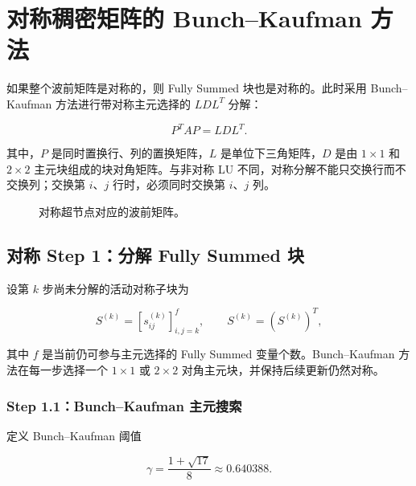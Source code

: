 \section{对称稠密矩阵的 Bunch--Kaufman 方法}

如果整个波前矩阵是对称的，则 Fully Summed 块也是对称的。此时采用 Bunch--Kaufman 方法进行带对称主元选择的 $LDL^T$ 分解：

\[
P^TAP=LDL^T.
\]

其中，$P$ 是同时置换行、列的置换矩阵，$L$ 是单位下三角矩阵，$D$ 是由 $1\times1$ 和 $2\times2$ 主元块组成的块对角矩阵。与非对称 LU 不同，对称分解不能只交换行而不交换列；交换第 $i$、$j$ 行时，必须同时交换第 $i$、$j$ 列。

\begin{figure}[htbp]
\centering
{}
\caption{对称超节点对应的波前矩阵。}
\label{fig:appendix-a-sym-front}
\end{figure}

\subsection{对称 Step 1：分解 Fully Summed 块}

设第 $k$ 步尚未分解的活动对称子块为

\[
S^{(k)}=\left[s_{ij}^{(k)}\right]_{i,j=k}^{f},
\qquad
S^{(k)}=\left(S^{(k)}\right)^T,
\]

其中 $f$ 是当前仍可参与主元选择的 Fully Summed 变量个数。Bunch--Kaufman 方法在每一步选择一个 $1\times1$ 或 $2\times2$ 对角主元块，并保持后续更新仍然对称。

\subsubsection{Step 1.1：Bunch--Kaufman 主元搜索}

定义 Bunch--Kaufman 阈值

\[
\gamma=\frac{1+\sqrt{17}}{8}\approx0.640388.
\]

